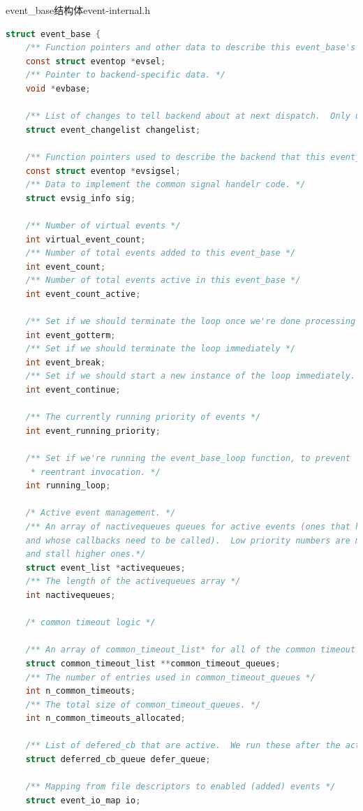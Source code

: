 \documentclass[11pt,a4paper]{article}
\begin{document}
event\_base结构体event-internal.h
\begin{lstlisting}[language=C]
struct event_base {
	/** Function pointers and other data to describe this event_base's backend. */
	const struct eventop *evsel;
	/** Pointer to backend-specific data. */
	void *evbase;

	/** List of changes to tell backend about at next dispatch.  Only used by the O(1) backends. */
	struct event_changelist changelist;

	/** Function pointers used to describe the backend that this event_base uses for signals */
	const struct eventop *evsigsel;
	/** Data to implement the common signal handelr code. */
	struct evsig_info sig;

	/** Number of virtual events */
	int virtual_event_count;
	/** Number of total events added to this event_base */
	int event_count;
	/** Number of total events active in this event_base */
	int event_count_active;

	/** Set if we should terminate the loop once we're done processing events. */
	int event_gotterm;
	/** Set if we should terminate the loop immediately */
	int event_break;
	/** Set if we should start a new instance of the loop immediately. */
	int event_continue;

	/** The currently running priority of events */
	int event_running_priority;

	/** Set if we're running the event_base_loop function, to prevent
	 * reentrant invocation. */
	int running_loop;

	/* Active event management. */
	/** An array of nactivequeues queues for active events (ones that have triggered, 
	and whose callbacks need to be called).  Low priority numbers are more important, 
	and stall higher ones.*/
	struct event_list *activequeues;
	/** The length of the activequeues array */
	int nactivequeues;

	/* common timeout logic */

	/** An array of common_timeout_list* for all of the common timeout values we know. */
	struct common_timeout_list **common_timeout_queues;
	/** The number of entries used in common_timeout_queues */
	int n_common_timeouts;
	/** The total size of common_timeout_queues. */
	int n_common_timeouts_allocated;

	/** List of defered_cb that are active.  We run these after the active events. */
	struct deferred_cb_queue defer_queue;

	/** Mapping from file descriptors to enabled (added) events */
	struct event_io_map io;


\end{lstlisting}
\end{document}
